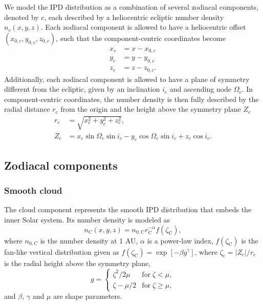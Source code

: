 \documentclass[twocolumn]{aa}
\begin{document}
We model the IPD distribution as a combination of several zodiacal 
components, denoted by $c$, each described by a heliocentric ecliptic 
number density $n_c(x,y,z)$. Each zodiacal component is allowed to have 
a heliocentric offset $(x_{0,c}, y_{0,c}, z_{0,c})$, such that the 
component-centric coordinates become
\begin{equation}    
    \begin{aligned}
        x_c&= x - x_{0,c}\\
        y_c&= y - y_{0,c}\\
        z_c&= z - z_{0,c}.
    \end{aligned}
\end{equation}
Additionally, each zodiacal component is allowed to have a plane of 
symmetry different from the ecliptic, given by an inclination $i_c$ and 
ascending node $\Omega_c$. In component-centric coordinates, the number 
density is then fully described by the radial distance $r_c$ from the 
origin and the height above the symmetry plane $Z_c$
\begin{align}
    r_c &= \sqrt{x_c^2 + y_c^2 + z_c^2},\\
    Z_c &= x_c\sin{\Omega_c}\sin{i_c} - y_c \cos{\Omega_c}\sin{i_c} + z_c \cos{i_c}.
\end{align}


\subsection{Zodiacal components}
\subsubsection{Smooth cloud}
The cloud component represents the smooth IPD distribution that embeds 
the inner Solar system. Its number density is modeled as
\begin{equation}
    n_\mathrm{C}(x,y,z)=n_{0, \mathrm{C}}r_\mathrm{C}^{-\alpha}f(\zeta_\mathrm{C}),
\end{equation}
where $n_{0, \mathrm{C}}$ is the number density at 1 AU, $\alpha$ is a 
power-law index, $f(\zeta_\mathrm{C})$ is the fan-like vertical 
distribution given as 
$f(\zeta_\mathrm{C}) = \exp {\left[-\beta g^\gamma \right]}$, where 
$\zeta_\mathrm{c} = |Z_\mathrm{c}|/r_\mathrm{c}$ is the radial height 
above the symmetry plane, 
\begin{equation}
    g = \begin{cases}
        \zeta^2/2\mu & \mathrm{for}\; \zeta < \mu,\\
        \zeta - \mu/2 & \mathrm{for}\; \zeta \geq \mu,
    \end{cases}
\end{equation}
and  $\beta$, $\gamma$ and $\mu$ are shape parameters.
\end{document}
